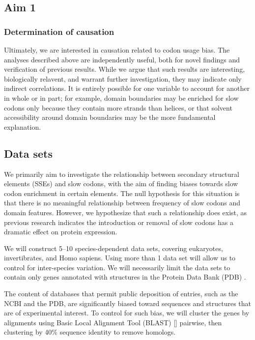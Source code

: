 \documentclass[11pt]{nih}
\begin{document}

\subsection{Aim 1}

\subsubsection{Determination of causation}
Ultimately, we are interested in causation related to codon usage bias. The analyses described above are independently useful, both for novel findings and verification of previous results. While we argue that such results are interesting, biologically relavent, and warrant further investigation, they may indicate only indirect correlations. It is entirely possible for one variable to account for another in whole or in part; for example, domain boundaries may be enriched for slow codons only because they contain more strands than helices, or that solvent accessibility around domain boundaries may be the more fundamental explanation.


\subsection{Data sets}

We primarily aim to investigate the relationship between secondary structural elements (SSEs) and slow codons, with the aim of finding biases towards slow codon enrichment in certain elements. The null hypothesis for this situation is that there is no meaningful relationship between frequency of slow codons and domain features. However, we hypothesize that such a relationship does exist, as previous research indicates the introduction or removal of slow codons has a dramatic effect on protein expression.

We will construct 5--10 species-dependent data sets, covering eukaryotes, invertibrates, and Homo sapiens. Using more than 1 data set will allow us to control for inter-species variation. We will necessarily limit the data sets to contain only genes annotated with structures in the Protein Data Bank (PDB) \citep{pdb}.

The content of databases that permit public deposition of entries, such as the NCBI and the PDB, are significantly biased toward sequences and structures that are of experimental interest. To control for such bias, we will cluster the genes by alignments using Basic Local Alignment Tool (BLAST) [] pairwise, then clustering by 40\% sequence identity to remove homologs.
\end{document}
